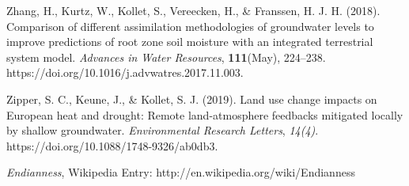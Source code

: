 \begin{thebibliography}{999}
Zhang, H., Kurtz, W., Kollet, S., Vereecken, H., \& Franssen, H. J. H. (2018). Comparison of different assimilation methodologies of groundwater levels to improve predictions of root zone soil moisture with an integrated terrestrial system model. {\em Advances in Water Resources}, {\bf 111}(May), 224–238. https://doi.org/10.1016/j.advwatres.2017.11.003.


Zipper, S. C., Keune, J., \& Kollet, S. J. (2019). Land use change impacts on European heat and drought: Remote land-atmosphere feedbacks mitigated locally by shallow groundwater. {\em Environmental Research Letters}, {\em 14(4)}. https://doi.org/10.1088/1748-9326/ab0db3.

{\em Endianness}, Wikipedia Entry: http://en.wikipedia.org/wiki/Endianness



\end{thebibliography}
